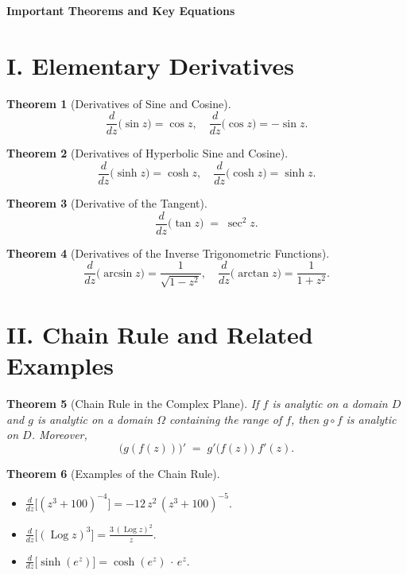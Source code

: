 \documentclass[12pt]{article}
\newcommand{\Log}{\operatorname{Log}}
\theoremstyle{plain}
\newtheorem{theorem}{Theorem}
\theoremstyle{definition}
\begin{document}
\begin{center}
    {\Large \textbf{Important Theorems and Key Equations}}
\end{center}
\vspace{1em}

\section*{I. Elementary Derivatives}

\begin{theorem}[Derivatives of Sine and Cosine]
\label{thm:sin-cos-derivatives}
\[
\frac{d}{dz}\bigl(\sin z\bigr) = \cos z,
\quad
\frac{d}{dz}\bigl(\cos z\bigr) = -\sin z.
\]
\end{theorem}

\begin{theorem}[Derivatives of Hyperbolic Sine and Cosine]
\[
\frac{d}{dz}\bigl(\sinh z\bigr) = \cosh z,
\quad
\frac{d}{dz}\bigl(\cosh z\bigr) = \sinh z.
\]
\end{theorem}

\begin{theorem}[Derivative of the Tangent]
\[
\frac{d}{dz}\bigl(\tan z\bigr) \;=\; \sec^2 z.
\]
\end{theorem}

\begin{theorem}[Derivatives of the Inverse Trigonometric Functions]
\[
\frac{d}{dz}\bigl(\arcsin z\bigr) = \frac{1}{\sqrt{1 - z^2}},
\quad
\frac{d}{dz}\bigl(\arctan z\bigr) = \frac{1}{1 + z^2}.
\]
\end{theorem}


\section*{II. Chain Rule and Related Examples}

\begin{theorem}[Chain Rule in the Complex Plane]
If \(f\) is analytic on a domain \(D\) and \(g\) is analytic on a domain \(\Omega\) containing the range of \(f\), then \(g\circ f\) is analytic on \(D\).  Moreover,
\[
\bigl(g(f(z))\bigr)' 
\;=\;
g'\bigl(f(z)\bigr)\;f'(z).
\]
\end{theorem}

\begin{theorem}[Examples of the Chain Rule]
\ 
\begin{itemize}
\item \(\displaystyle \frac{d}{dz}\bigl[(z^3 + 100)^{-4}\bigr]
  = -12\,z^2\,(z^3 + 100)^{-5}.\)
\smallskip
\item \(\displaystyle \frac{d}{dz}\bigl[(\Log z)^3\bigr]
  = \frac{3\,(\Log z)^2}{z}.\)
\smallskip
\item \(\displaystyle \frac{d}{dz}\bigl[\sinh(e^z)\bigr]
  = \cosh(e^z)\,\cdot\,e^z.\)
\end{itemize}
\end{theorem}
\end{document}
